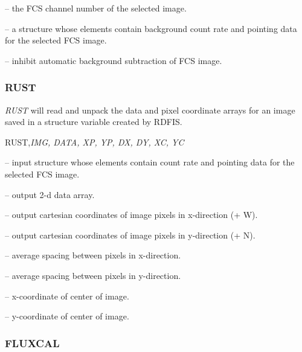 {{{

 -- the FCS channel number of the selected image.

 -- a structure whose elements contain background count
rate and pointing data for the selected FCS image.


 -- inhibit automatic background subtraction of FCS image.

\subsubsection{RUST}

{\em RUST} will read and unpack the data and pixel  coordinate arrays for an  
image saved in a structure variable created by RDFIS.


\noindent RUST,{\it IMG, DATA, XP, YP, DX, DY, XC, YC}


 -- input structure whose elements contain count
rate and pointing data for the selected FCS image.

 -- output 2-d data array.

 -- output cartesian coordinates of image pixels in
x-direction (+ W).

 -- output cartesian coordinates of image pixels in
y-direction (+ N).


 -- average spacing between pixels in x-direction.

 -- average spacing between pixels in y-direction.

 -- x-coordinate of center of image.

 -- y-coordinate of center of image.


\subsubsection{FLUXCAL}

}}}
